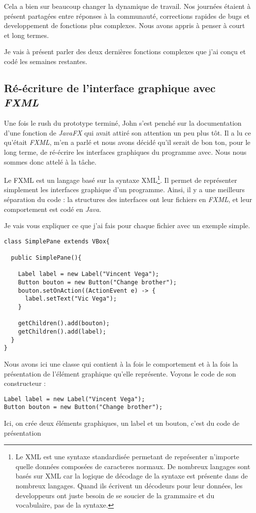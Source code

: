 Cela a bien sur beaucoup changer la dynamique de travail. Nos journées étaient à présent partagées entre réponses à la communauté, corrections rapides de bugs et developpement de fonctions plus complexes. Nous avons appris à penser à court et long termes.

Je vais à présent parler des deux dernières fonctions complexes que j'ai conçu et codé les semaines restantes.

%
%
\subsection{Ré-écriture de l'interface graphique avec \textit{FXML}}
Une fois le rush du prototype terminé, John s'est penché sur la documentation d'une fonction de \textit{JavaFX} qui avait attiré son attention un peu plus tôt. Il a lu ce qu'était \textit{FXML}, m'en a parlé et nous avons décidé qu'il serait de bon ton, pour le long terme, de ré-écrire les interfaces graphiques du programme avec. Nous nous sommes donc attelé à la tâche.

Le FXML est un langage basé sur la syntaxe XML\footnote{Le XML est une syntaxe standardisée permetant de représenter n'importe quelle données composées de caracteres normaux. De nombreux langages sont basés sur XML car la logique de décodage de la syntaxe est présente dans de nombreux langages. Quand ils écrivent un décodeurs pour leur données, les developpeurs ont juste besoin de se soucier de la grammaire et du vocabulaire, pas de la syntaxe.}. Il permet de représenter simplement les interfaces graphique d'un programme. Ainsi, il y a une meilleurs séparation du code : la structures des interfaces ont leur fichiers en \textit{FXML}, et leur comportement est codé en \textit{Java}.

Je vais vous expliquer ce que j'ai fais pour chaque fichier avec un exemple simple.
\begin{verbatim}
class SimplePane extends VBox{

  public SimplePane(){
    
    Label label = new Label("Vincent Vega");
    Button bouton = new Button("Change brother");
    bouton.setOnAction((ActionEvent e) -> {
      label.setText("Vic Vega");
    }

    getChildren().add(bouton);
    getChildren().add(label);
  }
}
\end{verbatim}

Nous avons ici une classe qui contient à la fois le comportement et à la fois la présentation de l'élément graphique qu'elle représente. Voyons le code de son constructeur :
\begin{verbatim}
Label label = new Label("Vincent Vega");
Button bouton = new Button("Change brother");
\end{verbatim}
Ici, on crée deux éléments graphiques, un label et un bouton, c'est du code de présentation

